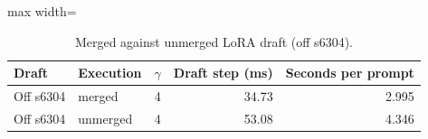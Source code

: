 \begin{table}[!htb]
\centering
\scriptsize
\setlength{\tabcolsep}{3.5pt}
\caption{Merged against unmerged LoRA draft (off s6304).}
\label{tab:t3unmerged}
\begin{adjustbox}{max width=\linewidth}
\begin{tabular}{llrrr}
\toprule
Draft & Execution & $\gamma$ & Draft step (ms) & Seconds per prompt \\
\midrule
Off s6304 & merged & 4 & 34.73 & 2.995 \\
Off s6304 & unmerged & 4 & 53.08 & 4.346 \\
\bottomrule
\end{tabular}
\end{adjustbox}
\end{table}
